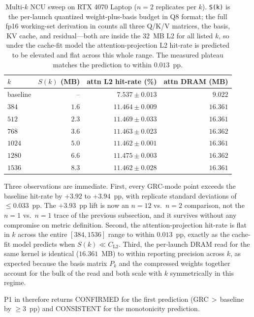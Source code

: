 \documentclass[11pt]{article}
\begin{document}
\begin{table}[h]\centering\footnotesize
\caption{Multi-$k$ NCU sweep on RTX 4070 Laptop ($n{=}2$ replicates per
$k$). \texttt{S(k)} is the per-launch quantized weight-plus-basis
budget in Q8 format; the full fp16 working-set derivation in
 counts all three Q/K/V matrices, the basis,
KV cache, and residual---both are inside the $32$~MB L2 for all listed
$k$, so under the cache-fit model the attention-projection L2 hit-rate
is predicted to be elevated and flat across this whole range. The
measured plateau matches the prediction to within $0.013$~pp.}
\label{tab:multi-k-ncu}
\begin{tabular}{lrrr}
\toprule
$k$ & $S(k)$ (MB) & attn L2 hit-rate (\%) & attn DRAM (MB) \\
\midrule
baseline   & --   & $7.537 \pm 0.013$ & $9.022$ \\
$384$      & $1.6$  & $11.464 \pm 0.009$ & $16.361$ \\
$512$      & $2.3$  & $11.469 \pm 0.033$ & $16.361$ \\
$768$      & $3.6$  & $11.463 \pm 0.023$ & $16.362$ \\
$1024$     & $5.0$  & $11.462 \pm 0.001$ & $16.361$ \\
$1280$     & $6.6$  & $11.475 \pm 0.003$ & $16.362$ \\
$1536$     & $8.3$  & $11.462 \pm 0.028$ & $16.361$ \\
\bottomrule
\end{tabular}
\end{table}

Three observations are immediate. First, every GRC-mode point exceeds
the baseline hit-rate by $+3.92$ to $+3.94$~pp, with replicate
standard deviations of $\le 0.033$~pp. The $+3.93$~pp lift is now an
$n{=}12$ vs.\ $n{=}2$ comparison, not the $n{=}1$ vs.\ $n{=}1$ trace
of the previous subsection, and it survives without any compromise on
metric definition. Second, the attention-projection hit-rate is flat
in $k$ across the entire $[384, 1536]$ range to within $0.013$~pp,
exactly as the cache-fit model predicts when $S(k)\ll C_\text{L2}$.
Third, the per-launch DRAM read for the same kernel is identical
($16.361$~MB) to within reporting precision across $k$, as expected
because the basis matrix $P_k$ and the compressed weights together
account for the bulk of the read and both scale with $k$ symmetrically
in this regime.

P1 in  therefore returns CONFIRMED for
the first prediction (GRC$\,>\,$baseline by $\ge 3$~pp) and
CONSISTENT for the monotonicity prediction.
\end{document}

